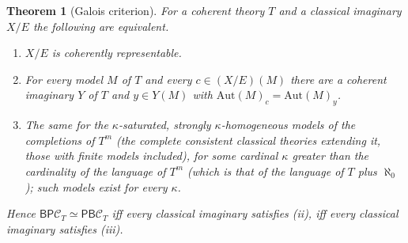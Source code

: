\documentclass[11pt]{amsart}
\newtheorem{thm}{Theorem}[section]
\theoremstyle{definition}
\newcommand{\PP}{\mathsf P}
\newcommand{\BB}{\mathsf B}
\newcommand{\cC}{\mathcal C}
\begin{document}
\begin{thm}[Galois criterion]\label{thm:galois}
For a coherent theory $T$ and a classical imaginary $X/E$ the following
are equivalent.
\begin{enumerate}
\item[(i)] $X/E$ is coherently representable.
\item[(ii)] For every model $M$ of $T$ and every $c\in(X/E)(M)$ there
are a coherent imaginary $Y$ of $T$ and $y\in Y(M)$ with $\mathrm{Aut}(M)_c
=\mathrm{Aut}(M)_y$.
\item[(iii)] The same for the $\kappa$-saturated, strongly
$\kappa$-homogeneous models of the completions of $T^m$ (the complete
consistent classical theories extending it, those with finite models
included), for some
cardinal $\kappa$ greater than the cardinality of the language of $T^m$
(which is that of the language of $T$ plus $\aleph_0$); such models
exist for every $\kappa$.
\end{enumerate}
Hence $\BB\PP\cC_T\simeq\PP\BB\cC_T$ iff every classical imaginary
satisfies (ii), iff every classical imaginary satisfies (iii).
\end{thm}
\end{document}
